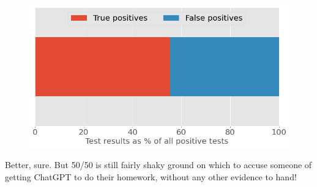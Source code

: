 \documentclass[
  letterpaper,
  DIV=11,
  numbers=noendperiod,
  oneside]{scrartcl}
\begin{document}
\begin{figure}

{\centering \includegraphics{fig3b.png}

}

\end{figure}


Better, sure. But 50/50 is still fairly shaky ground on which to accuse
someone of getting ChatGPT to do their homework, without any other
evidence to hand!
\end{document}
